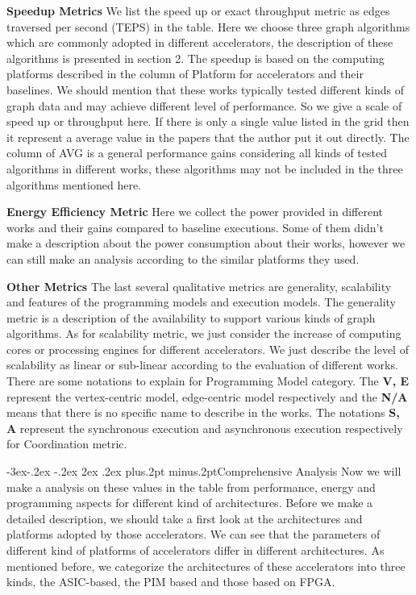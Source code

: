 \documentclass[twoside]{article}
\makeatletter
\def\subsection{\@startsection{subsection}{2}{\z@}%
 {-3ex\@plus -.2ex \@minus -.2ex}%
 {2ex \@plus.2ex}%
{\normalfont\normalsize\protect\baselineskip=12.5pt plus.2pt minus.2pt\bfseries}}
\makeatother
\begin{document}
\begin{multicols}{2}
{\bf Speedup Metrics} We list the speed up or exact throughput metric as edges traversed per second (TEPS) in the table. Here we choose three graph algorithms which are commonly adopted in different accelerators, the description of these algorithms is presented in section 2. The speedup is based on the computing platforms described in the column of Platform for accelerators and their baselines. We should mention that these works typically tested different kinds of graph data and may achieve different level of performance. So we give a scale of speed up or throughput here. If there is only a single value listed in the grid then it represent a average value in the papers that the author put it out directly. The column of AVG is a general performance gains considering all kinds of tested algorithms in different works, these algorithms may not be included in the three algorithms mentioned here. 

{\bf Energy Efficiency Metric} Here we collect the power provided in different works and their gains compared to baseline executions. Some of them didn't make a description about the power consumption about their works, however we can still make an analysis according to the similar platforms they used. 

{\bf Other Metrics} The last several qualitative metrics are generality, scalability and features of the programming models and execution models. The generality metric is a description of the availability to support various kinds of graph algorithms. As for scalability metric, we just consider the increase of computing cores or processing engines for different accelerators. We just describe the level of scalability as linear or sub-linear according to the evaluation of different works. There are some notations to explain for Programming Model category. The \textbf{V, E} represent the vertex-centric model, edge-centric model respectively and the \textbf{N/A} means that there is no specific name to describe in the works. The notations \textbf{S, A} represent the synchronous execution and asynchronous execution respectively for Coordination metric.

\subsection{Comprehensive Analysis}
Now we will make a analysis on these values in the table from performance, energy and programming aspects for different kind of architectures. Before we make a detailed description, we should take a first look at the architectures and platforms adopted by those accelerators. We can see that the parameters of different kind of platforms of accelerators differ in different architectures. As mentioned before, we categorize the architectures of these accelerators into three kinds, the ASIC-based, the PIM based and those based on FPGA. 


\end{multicols}
\end{document}

